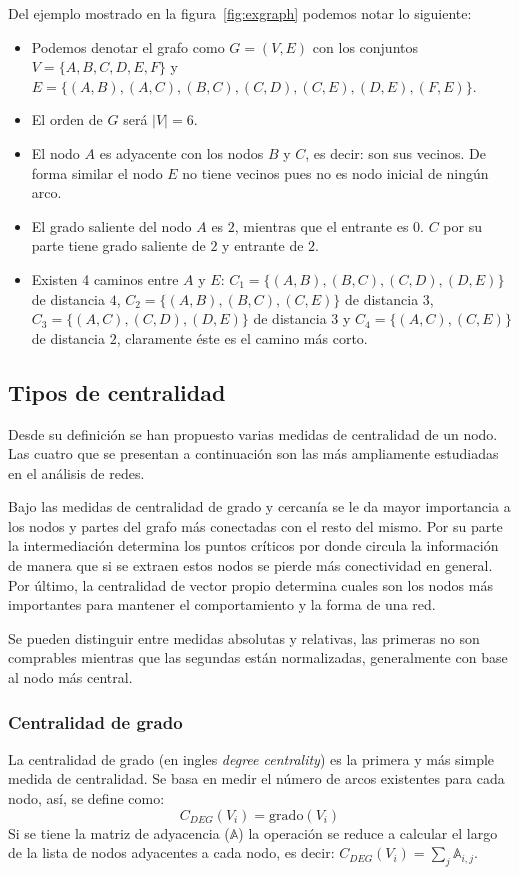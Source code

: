 Del ejemplo mostrado en la figura~\ref{fig:exgraph} podemos notar lo siguiente:
\begin{itemize}
  \item
    Podemos denotar el grafo como $G = (V,E)$ con los conjuntos 
    $V = \{A,B,C,D,E,F\}$ y 
    $E = \{(A,B),(A,C),(B,C),(C,D),(C,E),(D,E),(F,E)\}$.
  \item 
    El orden de $G$ será $|V| = 6$.
  \item
    El nodo $A$ es adyacente con los nodos $B$ y $C$, es decir: son sus vecinos.
    De forma similar el nodo $E$ no tiene vecinos pues no es nodo inicial de
    ningún arco.
  \item
    El grado saliente del nodo $A$ es $2$, mientras que el entrante es $0$.
    $C$ por su parte tiene grado saliente de $2$ y entrante de $2$.
  \item
    Existen 4 caminos entre $A$ y $E$: $C_1 = \{(A,B),(B,C),(C,D),(D,E)\}$ de
    distancia $4$, $C_2 = \{(A,B),(B,C),(C,E)\}$ de distancia $3$,
    $C_3 = \{(A,C),(C,D),(D,E)\}$ de distancia $3$ y
    $C_4 = \{(A,C),(C,E)\}$ de distancia $2$, claramente éste es el camino más
    corto.
\end{itemize}

\subsection{Tipos de centralidad}
Desde su definición se han propuesto varias medidas de centralidad de un nodo.
Las cuatro que se presentan a continuación son las más ampliamente estudiadas
en el análisis de redes.

Bajo las medidas de centralidad de grado y cercanía se le da mayor importancia a
los nodos y partes del grafo más conectadas con el resto del mismo. Por su parte
la intermediación determina los puntos críticos por donde circula la información
de manera que si se extraen estos nodos se pierde más conectividad en general.
Por último, la centralidad de vector propio determina cuales son los nodos más
importantes para mantener el comportamiento y la forma de una red.

Se pueden distinguir entre medidas absolutas y relativas, las primeras no son
comprables mientras que las segundas están normalizadas, generalmente con base
al nodo más central.

\subsubsection{Centralidad de grado}\label{ea:cent:degree}
La centralidad de grado (en ingles \emph{degree centrality}) es la primera y más
simple medida de centralidad\cite{sun2011survey}.
Se basa en medir el número de arcos existentes para cada nodo, así, se define
como: 
\begin{equation}
  \label{eq:deg}
  C_{DEG}(V_i) = \text{grado}(V_i)
\end{equation}
Si se tiene la matriz de adyacencia ($\mathbb{A}$) la operación se reduce a
calcular el largo de la lista de nodos adyacentes a cada nodo, es decir:
$ C_{DEG}(V_i) = \sum_{j} \mathbb{A}_{i,j}$.

